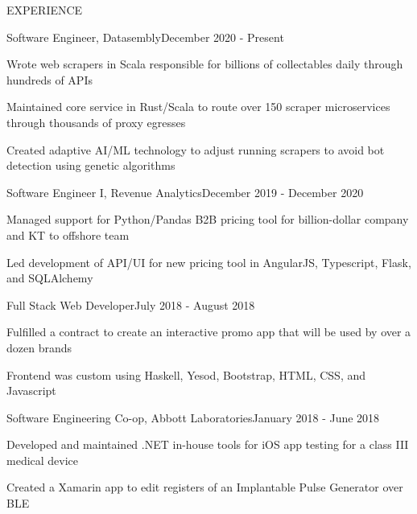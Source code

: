 \documentclass{resume} %
\begin{document}
\begin{rSection}{EXPERIENCE}

  \begin{rSubsection}{Software Engineer, Datasembly}{December 2020 - Present}{}{}
  \item Wrote web scrapers in Scala responsible for billions of collectables daily through hundreds of APIs
  \item Maintained core service in Rust/Scala to route over 150 scraper microservices through thousands of proxy egresses
  \item Created adaptive AI/ML technology to adjust running scrapers to avoid bot detection using genetic algorithms
  \end{rSubsection} 


  \begin{rSubsection}{Software Engineer I, Revenue Analytics}{December 2019 - December 2020}{}{}
  \item Managed support for Python/Pandas B2B pricing tool for billion-dollar company and KT to offshore team
  \item Led development of API/UI for new pricing tool in AngularJS, Typescript, Flask, and SQLAlchemy
  \end{rSubsection} 


  \begin{rSubsection}{Full Stack Web Developer}{July 2018 - August 2018}{}{}
  \item Fulfilled a contract to create an interactive promo app that will be used by over a dozen brands
  \item Frontend was custom using Haskell, Yesod, Bootstrap, HTML, CSS, and Javascript
  \end{rSubsection} 


  \begin{rSubsection}{Software Engineering Co-op, Abbott Laboratories}{January 2018 - June 2018}{}{}
  \item Developed and maintained .NET in-house tools for iOS app testing for a class III medical device
  \item Created a Xamarin app to edit registers of an Implantable Pulse Generator over BLE
  \end{rSubsection} 


\end{rSection}
\end{document}
